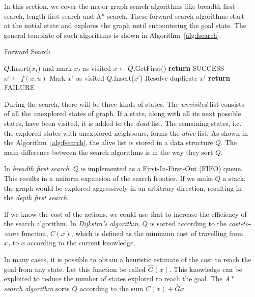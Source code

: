In this section, we cover the major graph search algorithms like breadth first search, length first search and A* search. These forward search algorithms start at the initial state and explores the graph until encountering the goal state. The general template of such algorithms \cite{lavalle2006planning} is shown in Algorithm~\ref{alg:fsearch}.

\begin{algorithm}
\caption{Forward Search}\label{alg:fsearch}
\begin{algorithmic}[1]
\State $Q$.Insert($x_I$) and mark $x_I$ as visited
\State $x\gets Q$.GetFirst()
\State \textbf{return} SUCCESS
\EndIf
{}
\State $x'\gets f(x,u)$
\State Mark $x'$ as visited
\State $Q$.Insert($x'$)
\Else
\State Resolve duplicate $x'$
\EndIf
\EndFor
\EndWhile
\State \textbf{return} FAILURE
\end{algorithmic}
\end{algorithm}

During the search, there will be three kinds of states. The \textit{unvisited} list consists of all the unexplored states of graph. If a state, along with all its next possible states, have been visited, it is added to the \textit{dead} list. The remaining states, i.e. the explored states with unexplored neighbours, forms the \textit{alive} list. As shown in the Algorithm~\ref{alg:fsearch}, the alive list is stored in a data structure $Q$. The main difference between the search algorithms is in the way they sort $Q$. 

In \textit{breadth first search}, $Q$ is implemented as a First-In-First-Out (FIFO) queue. This results in a uniform expansion of the search frontier. If we make $Q$ a stack, the graph would be explored aggressively in an arbitrary direction, resulting in the \textit{depth first search}. 

If we know the cost of the actions, we could use that to increase the efficiency of the search algorithm. In \textit{Dijkstra's algorithm}, $Q$ is sorted according to the \textit{cost-to-come} function, $C(x)$, which is defined as the minimum cost  of travelling from $x_I$ to $x$ according to the current knowledge. 

In many cases, it is possible to obtain a heuristic estimate of the cost to reach the goal from any state. Let this function be called $\hat{G}(x)$. This knowledge can be exploited to reduce the number of states explored to reach the goal. The \textit{A* search algorithm} sorts $Q$ according to the sum $C(x) + \hat{G}{x}$.


